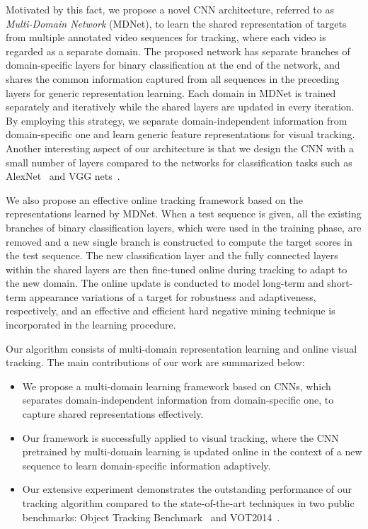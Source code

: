 \documentclass[10pt,twocolumn,letterpaper]{article}
\begin{document}
Motivated by this fact, we propose a novel CNN architecture, referred to as {\em Multi-Domain Network} (MDNet), to learn the shared representation of targets from multiple annotated video sequences for tracking, where each video is regarded as a separate domain.
The proposed network has separate branches of domain-specific layers for binary classification at the end of the network, and shares the common information captured from all sequences in the preceding layers for generic representation learning.
Each domain in MDNet is trained separately and iteratively while the shared layers are updated in every iteration.
By employing this strategy, we separate domain-independent information from domain-specific one and learn generic feature representations for visual tracking.
Another interesting aspect of our architecture is that we design the CNN with a small number of layers compared to the networks for classification tasks such as AlexNet~\cite{krizhevsky2012imagenet} and VGG nets~\cite{chatfield2014return,SimonyanICLR15}.

We also propose an effective online tracking framework based on the representations learned by MDNet. 
When a test sequence is given, all the existing branches of binary classification layers, which were used in the training phase, are removed and a new single branch is constructed to compute the target scores in the test sequence. 
The new classification layer and the fully connected layers within the shared layers are then fine-tuned online during tracking to adapt to the new domain.
The online update is conducted to model long-term and short-term appearance variations of a target for robustness and adaptiveness, respectively, and an effective and efficient hard negative mining technique is incorporated in the learning procedure. 

Our algorithm consists of multi-domain representation learning and online visual tracking.
The main contributions of our work are summarized below:
\begin{itemize}
\item We propose a multi-domain learning framework based on CNNs, which separates domain-independent information from domain-specific one, to capture shared representations effectively.
\item Our framework is successfully applied to visual tracking, where the CNN pretrained by multi-domain learning is updated online in the context of a new sequence to learn domain-specific information adaptively.
\item Our extensive experiment demonstrates the outstanding performance of our tracking algorithm compared to the state-of-the-art techniques in two public benchmarks: Object Tracking Benchmark~\cite{otb2} and VOT2014~\cite{vot14}.
\end{itemize}
\end{document}
